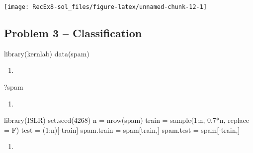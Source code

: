 \documentclass[
]{article}
\newenvironment{Shaded}{\begin{snugshade}}{\end{snugshade}}
\newcommand{\AttributeTok}[1]{\textcolor[rgb]{0.77,0.63,0.00}{#1}}
\newcommand{\DecValTok}[1]{\textcolor[rgb]{0.00,0.00,0.81}{#1}}
\newcommand{\FloatTok}[1]{\textcolor[rgb]{0.00,0.00,0.81}{#1}}
\newcommand{\FunctionTok}[1]{\textcolor[rgb]{0.00,0.00,0.00}{#1}}
\newcommand{\NormalTok}[1]{#1}
\newcommand{\OtherTok}[1]{\textcolor[rgb]{0.56,0.35,0.01}{#1}}
\newcommand{\SpecialCharTok}[1]{\textcolor[rgb]{0.00,0.00,0.00}{#1}}
\providecommand{\tightlist}{%
  \setlength{\itemsep}{0pt}\setlength{\parskip}{0pt}}
\begin{document}
\texttt{[image: RecEx8-sol\_files/figure-latex/unnamed-chunk-12-1]}

\hypertarget{problem-3-classification}{%
\subsection{Problem 3 --
Classification}\label{problem-3-classification}}

\begin{Shaded}
\begin{Highlighting}[]
\FunctionTok{library}\NormalTok{(kernlab)}
\FunctionTok{data}\NormalTok{(spam)}
\end{Highlighting}
\end{Shaded}

\begin{enumerate}
\def\labelenumi{\alph{enumi})}
\tightlist
\item
\end{enumerate}

\begin{Shaded}
\begin{Highlighting}[]
\NormalTok{?spam}
\end{Highlighting}
\end{Shaded}

\begin{enumerate}
\def\labelenumi{\alph{enumi})}
\setcounter{enumi}{1}
\tightlist
\item
\end{enumerate}

\begin{Shaded}
\begin{Highlighting}[]
\FunctionTok{library}\NormalTok{(ISLR)}
\FunctionTok{set.seed}\NormalTok{(}\DecValTok{4268}\NormalTok{)}
\NormalTok{n }\OtherTok{=} \FunctionTok{nrow}\NormalTok{(spam)}
\NormalTok{train }\OtherTok{=} \FunctionTok{sample}\NormalTok{(}\DecValTok{1}\SpecialCharTok{:}\NormalTok{n, }\FloatTok{0.7}\SpecialCharTok{*}\NormalTok{n, }\AttributeTok{replace =}\NormalTok{ F)}
\NormalTok{test }\OtherTok{=}\NormalTok{ (}\DecValTok{1}\SpecialCharTok{:}\NormalTok{n)[}\SpecialCharTok{{-}}\NormalTok{train]}
\NormalTok{spam.train }\OtherTok{=}\NormalTok{ spam[train,]}
\NormalTok{spam.test }\OtherTok{=}\NormalTok{ spam[}\SpecialCharTok{{-}}\NormalTok{train,]}
\end{Highlighting}
\end{Shaded}

\begin{enumerate}
\def\labelenumi{\alph{enumi})}
\setcounter{enumi}{2}
\tightlist
\item
\end{enumerate}
\end{document}

